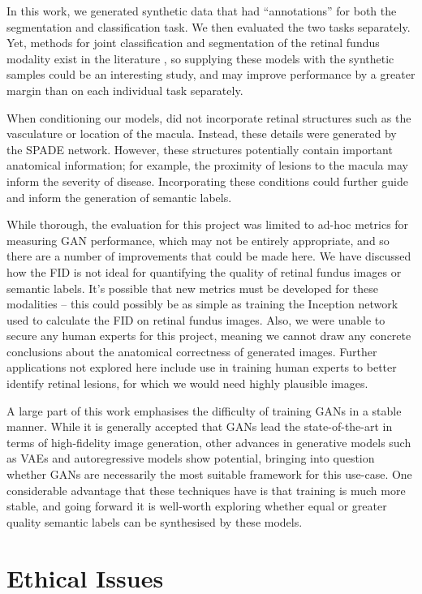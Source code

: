 In this work, we generated synthetic data that had ``annotations'' for both the segmentation and classification task.
We then evaluated the two tasks separately.
Yet, methods for joint classification and segmentation of the retinal fundus modality exist in the literature \cite{ynet}, so supplying these models with the synthetic samples could be an interesting study, and may improve performance by a greater margin than on each individual task separately.

When conditioning our models, did not incorporate retinal structures such as the vasculature or location of the macula. 
Instead, these details were generated by the SPADE network.
However, these structures potentially contain important anatomical information; for example, the proximity of lesions to the macula may inform the severity of disease.
Incorporating these conditions could further guide and inform the generation of semantic labels.

While thorough, the evaluation for this project was limited to ad-hoc metrics for measuring GAN performance, which may not be entirely appropriate, and so there are a number of improvements that could be made here.
We have discussed how the FID is not ideal for quantifying the quality of retinal fundus images or semantic labels.
It's possible that new metrics must be developed for these modalities -- this could possibly be as simple as training the Inception network used to calculate the FID on retinal fundus images.
Also, we were unable to secure any human experts for this project, meaning we cannot draw any concrete conclusions about the anatomical correctness of generated images.
Further applications not explored here include use in training human experts to better identify retinal lesions, for which we would need highly plausible images.

A large part of this work emphasises the difficulty of training GANs in a stable manner.
While it is generally accepted that GANs lead the state-of-the-art in terms of high-fidelity image generation, other advances in generative models such as VAEs and autoregressive models show potential, bringing into question whether GANs are necessarily the most suitable framework for this use-case.
One considerable advantage that these techniques have is that training is much more stable, and going forward it is well-worth exploring whether equal or greater quality semantic labels can be synthesised by these models.

\section{Ethical Issues} \label{sec:ethics}

